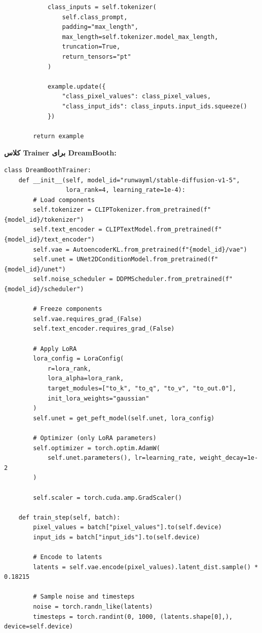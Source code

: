\begin{verbatim}
            class_inputs = self.tokenizer(
                self.class_prompt,
                padding="max_length",
                max_length=self.tokenizer.model_max_length,
                truncation=True,
                return_tensors="pt"
            )
            
            example.update({
                "class_pixel_values": class_pixel_values,
                "class_input_ids": class_inputs.input_ids.squeeze()
            })
        
        return example
\end{verbatim}

\textbf{کلاس Trainer برای DreamBooth:}
\begin{verbatim}
class DreamBoothTrainer:
    def __init__(self, model_id="runwayml/stable-diffusion-v1-5", 
                 lora_rank=4, learning_rate=1e-4):
        # Load components
        self.tokenizer = CLIPTokenizer.from_pretrained(f"{model_id}/tokenizer")
        self.text_encoder = CLIPTextModel.from_pretrained(f"{model_id}/text_encoder")
        self.vae = AutoencoderKL.from_pretrained(f"{model_id}/vae")
        self.unet = UNet2DConditionModel.from_pretrained(f"{model_id}/unet")
        self.noise_scheduler = DDPMScheduler.from_pretrained(f"{model_id}/scheduler")
        
        # Freeze components
        self.vae.requires_grad_(False)
        self.text_encoder.requires_grad_(False)
        
        # Apply LoRA
        lora_config = LoraConfig(
            r=lora_rank,
            lora_alpha=lora_rank,
            target_modules=["to_k", "to_q", "to_v", "to_out.0"],
            init_lora_weights="gaussian"
        )
        self.unet = get_peft_model(self.unet, lora_config)
        
        # Optimizer (only LoRA parameters)
        self.optimizer = torch.optim.AdamW(
            self.unet.parameters(), lr=learning_rate, weight_decay=1e-2
        )
        
        self.scaler = torch.cuda.amp.GradScaler()
    
    def train_step(self, batch):
        pixel_values = batch["pixel_values"].to(self.device)
        input_ids = batch["input_ids"].to(self.device)
        
        # Encode to latents
        latents = self.vae.encode(pixel_values).latent_dist.sample() * 0.18215
        
        # Sample noise and timesteps
        noise = torch.randn_like(latents)
        timesteps = torch.randint(0, 1000, (latents.shape[0],), device=self.device)
        

\end{verbatim}
